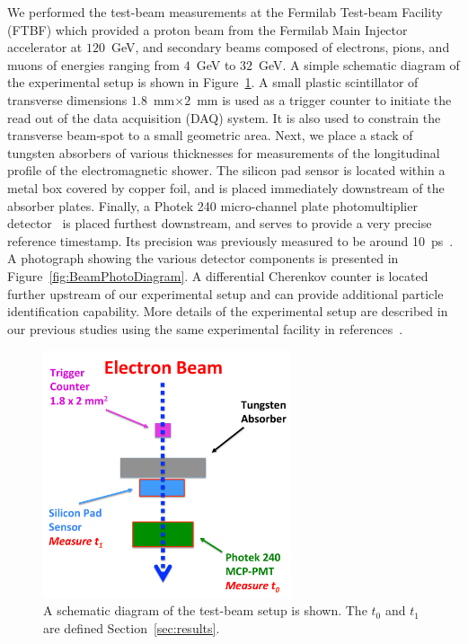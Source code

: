 \documentclass[12pt]{article}
\begin{document}
{We performed the test-beam measurements at the Fermilab Test-beam Facility
(FTBF) which provided a proton beam from the Fermilab Main Injector accelerator
at $120$~GeV, and secondary beams composed of electrons, pions, and muons of
energies ranging from $4$~GeV to $32$~GeV. A simple schematic diagram of the
experimental setup is shown in Figure~\ref{fig:BeamSchematicDiagram}. A small
plastic scintillator of transverse dimensions $1.8$~mm$\times 2$~mm is used as a
trigger counter to initiate the read out of the data acquisition (DAQ) system.
It is also used to constrain the transverse beam-spot to a small geometric area.
Next, we place a stack of tungsten absorbers of various thicknesses for
measurements of the longitudinal profile of the electromagnetic shower. The
silicon pad sensor is located within a metal box covered by copper foil, and is
placed immediately downstream of the absorber plates. Finally, a Photek 240
micro-channel plate photomultiplier detector~\cite{Anderson:2015gha,
MCPFastCaloNIMA, Ronzhin2015288,Ronzhin201552} is placed furthest downstream,
and serves to provide a very precise reference timestamp. Its precision was
previously measured to be around 10~ps~\cite{MCPShowerMaxPaper}. A photograph showing the various
detector components is presented in Figure~\ref{fig:BeamPhotoDiagram}. A
differential Cherenkov counter is located further upstream of our experimental
setup and can provide additional particle identification capability. More
details of the experimental setup are described in our previous studies using
the same experimental facility in references~\cite{Anderson:2015gha,
MCPFastCaloNIMA, Ronzhin2015288,Ronzhin201552}.

\begin{figure}[htbp] 
\centering
\includegraphics[width=0.65\textwidth]{plots/BeamSchematicDiagram.pdf} 
\caption{A schematic diagram of the test-beam setup is shown. The $t_0$ and $t_1$ are defined Section~\ref{sec:results}.} 
\label{fig:BeamSchematicDiagram} 
\end{figure} 

}
\end{document}
